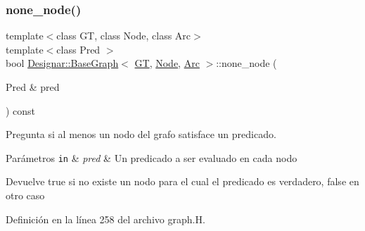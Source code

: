\subsubsection{\texorpdfstring{none\+\_\+node()}{none\_node()}\hspace{0.1cm}{\footnotesize\ttfamily [1/2]}}
{\footnotesize\ttfamily template$<$class GT, class Node, class Arc$>$ \\
template$<$class Pred $>$ \\
bool \hyperlink{class_designar_1_1_base_graph}{Designar\+::\+Base\+Graph}$<$ \hyperlink{demo-buildgraph_8_c_a3001c40d2c31ca87ed96cd7d1334a55e}{GT}, \hyperlink{namespace_designar_a5af326c65aa2bd26b26c410f2030d09e}{Node}, \hyperlink{namespace_designar_a3f55fb5513d62ff47cbc8f72b8e95d6f}{Arc} $>$\+::none\+\_\+node (\begin{DoxyParamCaption}\item[{Pred \&}]{pred }\end{DoxyParamCaption}) const\hspace{0.3cm}{\ttfamily [inline]}}



Pregunta si al menos un nodo del grafo satisface un predicado. 


\begin{DoxyParams}[1]{Parámetros}
\mbox{\tt in}  & {\em pred} & Un predicado a ser evaluado en cada nodo \\
\hline
\end{DoxyParams}
\begin{DoxyReturn}{Devuelve}
{\ttfamily true} si no existe un nodo para el cual el predicado es verdadero, {\ttfamily false} en otro caso 
\end{DoxyReturn}


Definición en la línea 258 del archivo graph.\+H.

\mbox{\label{class_designar_1_1_base_graph_a394cdb81d0b0402e348dc87d2456d2d7}} 
